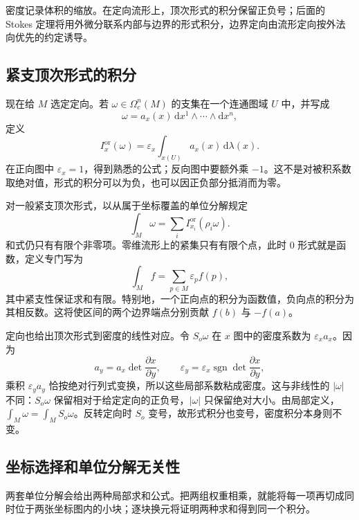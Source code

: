 密度记录体积的缩放。在定向流形上，顶次形式的积分保留正负号；后面的 Stokes 定理将用外微分联系内部与边界的形式积分，边界定向由流形定向按外法向优先的约定诱导。

\subsection{紧支顶次形式的积分}
\label{g1:subsec:1403:03}

现在给 \(M\) 选定定向。若 \(\omega\in\Omega_c^n(M)\) 的支集在一个连通图域 \(U\) 中，并写成
\[
	\omega=a_x(x)\,\mathrm{d}x^1\wedge\cdots\wedge\mathrm{d}x^n,
\]
定义
\begin{equation}\label{g1:eq:oriented-chart-integral}
	I_x^{\mathrm{or}}(\omega)=\varepsilon_x\int_{x(U)}a_x(x)\,\mathrm{d}\lambda(x).
\end{equation}
在正向图中 \(\varepsilon_x=1\)，得到熟悉的公式；反向图中要额外乘 \(-1\)。这不是对被积系数取绝对值，形式的积分可以为负，也可以因正负部分抵消而为零。

\ProseParagraphBreak

对一般紧支顶次形式，以从属于坐标覆盖的单位分解规定
\begin{equation}\label{g1:eq:top-form-integral-definition}
	\int_M\omega=\sum_i I_{x_i}^{\mathrm{or}}(\rho_i\omega).
\end{equation}
和式仍只有有限个非零项。零维流形上的紧集只有有限个点，此时 \(0\) 形式就是函数，定义专门写为
\[
	\int_M f=\sum_{p\in M}\varepsilon_p f(p),
\]
其中紧支性保证求和有限。特别地，一个正向点的积分为函数值，负向点的积分为其相反数。这将使区间的两个边界端点分别贡献 \(f(b)\) 与 \(-f(a)\)。

\ProseParagraphBreak

定向也给出顶次形式到密度的线性对应。令 \(S_o\omega\) 在 \(x\) 图中的密度系数为 \(\varepsilon_xa_x\)。因为
\[
	a_y=a_x\det\frac{\partial x}{\partial y},\qquad
	\varepsilon_y=\varepsilon_x\operatorname{sgn}\det\frac{\partial x}{\partial y},
\]
乘积 \(\varepsilon_ya_y\) 恰按绝对行列式变换，所以这些局部系数粘成密度。这与非线性的 \(|\omega|\) 不同：\(S_o\omega\) 保留相对于给定定向的正负号，\(|\omega|\) 只保留绝对大小。由局部定义，\(\int_M\omega=\int_M S_o\omega\)。反转定向时 \(S_o\) 变号，故形式积分也变号，密度积分本身则不变。

\subsection{坐标选择和单位分解无关性}
\label{g1:subsec:1403:04}

两套单位分解会给出两种局部求和公式。把两组权重相乘，就能将每一项再切成同时位于两张坐标图内的小块；逐块换元将证明两种求和得到同一个积分。

